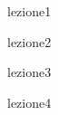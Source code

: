 \documentclass[12pt,a4paper,headings=optiontohead]{scrbook}
\begin{document}
{lezione1}

\newpage

{lezione2}

\newpage

{lezione3}



\newpage

{lezione4}


\newpage
\end{document}
